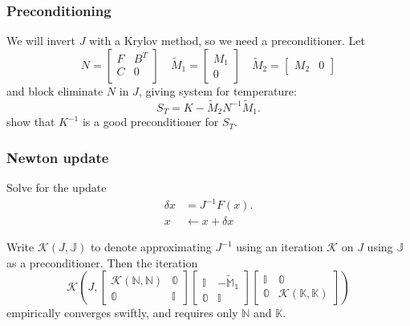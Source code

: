 \documentclass[presentation]{beamer}
\newcommand{\KSP}[2]{\ensuremath{\mathcal{K}\left(#1, \mathbb{#2}\right)}}
\newcommand{\ksp}[1]{\KSP{#1}{#1}}
\begin{document}
\begin{frame}
  \frametitle{Preconditioning}
  We will invert $J$ with a Krylov method, so we need a
  preconditioner.
  Let
  \begin{equation*}
    N = \begin{bmatrix}
      F & B^T\\
      C & 0 \\
    \end{bmatrix} \quad
    \tilde{M}_1 =
    \begin{bmatrix}
      M_1 \\
      0
    \end{bmatrix} \quad
    \tilde{M}_2 = \begin{bmatrix}
      M_2 & 0
    \end{bmatrix}
  \end{equation*}
  and block eliminate $N$ in $J$, giving system for temperature:
  \begin{equation*}
    S_T = K - \tilde{M}_2 N^{-1} \tilde{M}_1.
  \end{equation*}
  \textcite{Howle:2012} show that $K^{-1}$ is a good preconditioner for
  $S_T$.
\end{frame}
\begin{frame}
  \frametitle{Newton update}
  Solve for the update
  \begin{equation*}
    \begin{split}
      \delta x &= J^{-1} F(x). \\
      x &\leftarrow x + \delta x
    \end{split}
  \end{equation*}

  Write $\mathcal{K}(J, \mathbb{J})$ to denote approximating $J^{-1}$
  using an iteration $\mathcal{K}$ on $J$ using $\mathbb{J}$ as a
  preconditioner.  Then the iteration
  \begin{equation*}
    \KSP{J}{\begin{bmatrix}
      \ksp{N} & 0 \\
      0 & I
    \end{bmatrix}
    \begin{bmatrix}
      I & -\tilde{M}_1 \\
      0 & I
    \end{bmatrix}
    \begin{bmatrix}
      I & 0\\
      0 & \ksp{K}
    \end{bmatrix}}
  \end{equation*}
  empirically converges swiftly, and
  requires only $\mathbb{N}$ and $\mathbb{K}$.
\end{frame}
\end{document}
